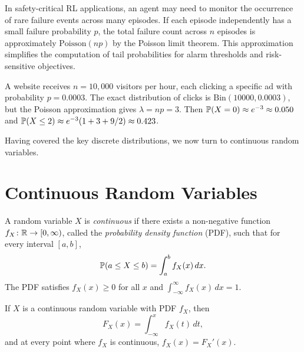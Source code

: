 \documentclass[11pt,a4paper]{article}
\begin{document}
\begin{rlconnection}[title={Poisson Processes in RL Event Counting}]
In safety-critical RL applications, an agent may need to monitor the
occurrence of rare failure events across many episodes. If each episode
independently has a small failure probability $p$, the total failure
count across $n$ episodes is approximately $\mathrm{Poisson}(np)$ by the
Poisson limit theorem. This approximation simplifies the computation of
tail probabilities for alarm thresholds and risk-sensitive objectives.
\end{rlconnection}

\begin{example}
\label{ex:poisson_approx}
A website receives $n = 10{,}000$ visitors per hour, each clicking a
specific ad with probability $p = 0.0003$. The exact distribution of
clicks is $\mathrm{Bin}(10000, 0.0003)$, but the Poisson approximation
gives $\lambda = np = 3$. Then $\mathbb{P}(X = 0) \approx e^{-3} \approx
0.050$ and $\mathbb{P}(X \leq 2) \approx e^{-3}(1 + 3 + 9/2) \approx 0.423$.
\end{example}

Having covered the key discrete distributions, we now turn to continuous
random variables.


\section{Continuous Random Variables}
\label{sec:continuous}

\begin{definition}
\label{def:continuous_rv}
A random variable $X$ is \emph{continuous} if there exists a non-negative
function $f_X \colon \mathbb{R} \to [0, \infty)$, called the \emph{probability
density function} (PDF), such that for every interval $[a, b]$,
\[
    \mathbb{P}(a \leq X \leq b) = \int_a^b f_X(x) \, dx.
\]
The PDF satisfies $f_X(x) \geq 0$ for all $x$ and
$\int_{-\infty}^{\infty} f_X(x) \, dx = 1$.
\end{definition}

\begin{proposition}
\label{prop:cdf_pdf}
If $X$ is a continuous random variable with PDF $f_X$, then
\[
    F_X(x) = \int_{-\infty}^x f_X(t) \, dt,
\]
and at every point where $f_X$ is continuous,
$f_X(x) = F_X'(x)$.
\end{proposition}
\end{document}
